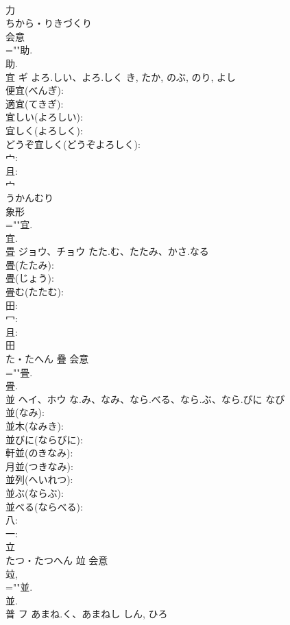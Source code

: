 \documentclass[8pt]{extreport}
\begin{document}
\begin{CJK}{UTF8}{min}
\\	力	
\\	ちから・りきづくり	
\\	会意 
\\	=""助.
\\	助.
\\	宜	ギ	よろ.しい、よろ.しく	き, たか, のぶ, のり, よし	
\\	便宜(べんぎ): 
\\	適宜(てきぎ): 
\\	宜しい(よろしい): 
\\	宜しく(よろしく): 
\\	どうぞ宜しく(どうぞよろしく): 
\\	宀: 
\\	且: 
\\	宀	
\\	うかんむり	
\\	象形 
\\	=""宜.
\\	宜.
\\	畳	ジョウ、チョウ	たた.む、たたみ、かさ.なる		
\\	畳(たたみ): 
\\	畳(じょう): 
\\	畳む(たたむ): 
\\	田: 
\\	冖: 
\\	且: 
\\	田	
\\	た・たへん	疊	会意 
\\	=""畳.
\\	畳.
\\	並	ヘイ、ホウ	な.み、なみ、なら.べる、なら.ぶ、なら.びに	なび	
\\	並(なみ): 
\\	並木(なみき): 
\\	並びに(ならびに): 
\\	軒並(のきなみ): 
\\	月並(つきなみ): 
\\	並列(へいれつ): 
\\	並ぶ(ならぶ): 
\\	並べる(ならべる): 
\\	八: 
\\	一: 
\\	立	
\\	たつ・たつへん	竝	会意 
\\	竝, 
\\	=""並.
\\	並.
\\	普	フ	あまね.く、あまねし	しん, ひろ	

\end{CJK}
\end{document}
